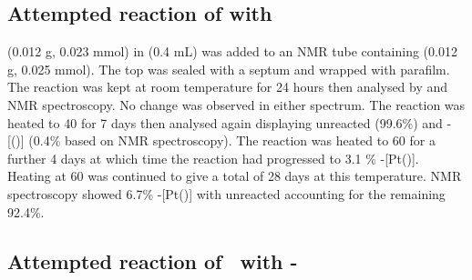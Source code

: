 
\subsection*{Attempted reaction of \tButhixantphos{} with }

\tButhixantphos{} (0.012 g, 0.023 mmol) in  (0.4 mL) was added to an NMR tube containing  (0.012 g, 0.025 mmol).  The top was sealed with a septum and wrapped with parafilm.  The reaction was kept at room temperature for 24 hours then analysed by \proton{} and \phosphorus{} NMR spectroscopy.  No change was observed in either spectrum.  The reaction was heated to 40 \degC{} for 7 days then analysed again displaying unreacted \tButhixantphos{} (99.6\%) and \trans-[(\tButhixantphos)] (0.4\% based on \phosphorus{} NMR spectroscopy).  The reaction was heated to 60 \degC{} for a further 4 days at which time the reaction had progressed to 3.1 \% \trans-[Pt(\tButhixantphos)].  Heating at 60 \degC{} was continued to give a total of 28 days at this temperature.  NMR spectroscopy showed 6.7\% \trans-[Pt(\tButhixantphos)] with unreacted \tButhixantphos{} accounting for the remaining 92.4\%.

\subsection*{Attempted reaction of \tButhixantphos\ with \cis-}

